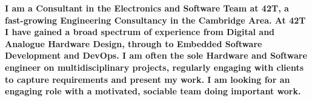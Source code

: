 \begin{minipage}{170mm}
  \bfseries
  I am a Consultant in the Electronics and Software Team at 42T, a fast-growing Engineering Consultancy in the Cambridge Area.
  At 42T I have gained a broad spectrum of experience from Digital and Analogue Hardware Design, through to Embedded Software Development and DevOps.
  I am often the sole Hardware and Software engineer on multidisciplinary projects, regularly engaging with clients to capture requirements and present my work. 
  I am looking for an engaging role with a motivated, sociable team doing important work.
\end{minipage}
